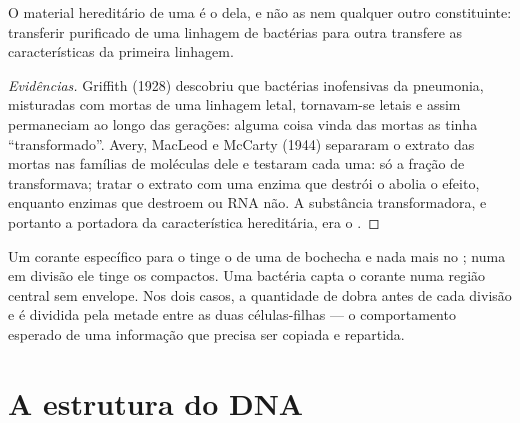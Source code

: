 \begin{proposition}\label{prop:g10:universal-dna:material}
O material hereditário de uma  é o  dela, e não as 
nem qualquer outro constituinte: transferir  purificado de uma
linhagem de bactérias para outra transfere as características da
primeira linhagem.
\end{proposition}
\begin{proof}[Evidências]
Griffith (1928) descobriu que bactérias inofensivas da pneumonia,
misturadas com  mortas de uma linhagem letal, tornavam-se letais
e assim permaneciam ao longo das gerações: alguma coisa vinda das
 mortas as tinha ``transformado''. Avery, MacLeod e McCarty
(1944) separaram o extrato das  mortas nas famílias de moléculas
dele e testaram cada uma: só a fração de  transformava; tratar o
extrato com uma enzima que destrói o  abolia o efeito, enquanto
enzimas que destroem  ou RNA não. A substância transformadora,
e portanto a portadora da característica hereditária, era o .
\end{proof}

\begin{example}\label{ex:g10:universal-dna:where}
Um corante específico para o  tinge o  de uma  de
bochecha e nada mais no ; numa  em divisão ele tinge os
 compactos. Uma bactéria capta o corante numa região central
sem envelope. Nos dois casos, a quantidade de  dobra antes de cada
divisão e é dividida pela metade entre as duas células-filhas --- o
comportamento esperado de uma informação que precisa ser copiada e
repartida.
\end{example}

\section{A estrutura do DNA}

